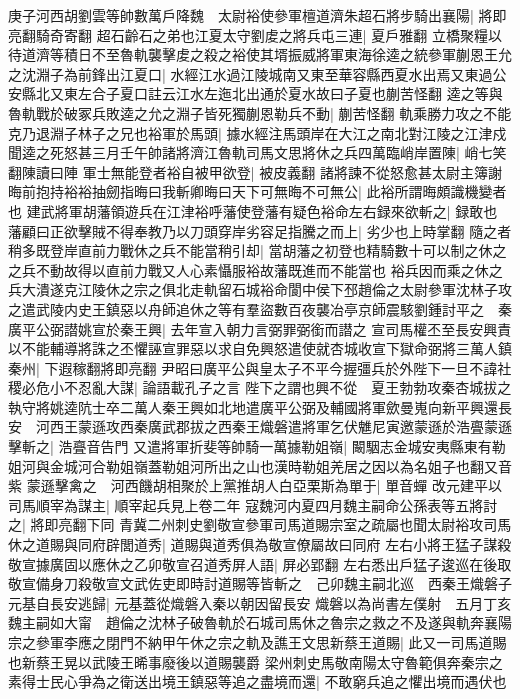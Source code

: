 庚子河西胡劉雲等帥數萬戶降魏　太尉裕使參軍檀道濟朱超石將步騎出襄陽|{
	將即亮翻騎奇寄翻}
超石齡石之弟也江夏太守劉䖍之將兵屯三連|{
	夏戶雅翻}
立橋聚糧以待道濟等積日不至魯軌襲擊䖍之殺之裕使其壻振威將軍東海徐逵之統參軍蒯恩王允之沈淵子為前鋒出江夏口|{
	水經江水過江陵城南又東至華容縣西夏水出焉又東過公安縣北又東左合子夏口註云江水左迤北出通於夏水故曰子夏也蒯苦怪翻}
逵之等與魯軌戰於破冢兵敗逵之允之淵子皆死獨蒯恩勒兵不動|{
	蒯苦怪翻}
軌乘勝力攻之不能克乃退淵子林子之兄也裕軍於馬頭|{
	據水經注馬頭岸在大江之南北對江陵之江津戍}
聞逵之死怒甚三月壬午帥諸將濟江魯軌司馬文思將休之兵四萬臨峭岸置陳|{
	峭七笑翻陳讀曰陣}
軍士無能登者裕自被甲欲登|{
	被皮義翻}
諸將諫不從怒愈甚太尉主簿謝晦前抱持裕裕抽劒指晦曰我斬卿晦曰天下可無晦不可無公|{
	此裕所謂晦頗識機變者也}
建武將軍胡藩領遊兵在江津裕呼藩使登藩有疑色裕命左右録來欲斬之|{
	録敢也}
藩顧曰正欲擊賊不得奉教乃以刀頭穿岸劣容足指騰之而上|{
	劣少也上時掌翻}
隨之者稍多既登岸直前力戰休之兵不能當稍引却|{
	當胡藩之初登也精騎數十可以制之休之之兵不動故得以直前力戰又人心素懾服裕故藩既進而不能當也}
裕兵因而乘之休之兵大潰遂克江陵休之宗之俱北走軌留石城裕命閬中侯下邳趙倫之太尉參軍沈林子攻之遣武陵内史王鎮惡以舟師追休之等有羣盜數百夜襲冶亭京師震駭劉鍾討平之　秦廣平公弼譛姚宣於秦王興|{
	去年宣入朝力言弼罪弼銜而譛之}
宣司馬權丕至長安興責以不能輔導將誅之丕懼誣宣罪惡以求自免興怒遣使就杏城收宣下獄命弼將三萬人鎮秦州|{
	下遐稼翻將即亮翻}
尹昭曰廣平公與皇太子不平今握彊兵於外陛下一旦不諱社稷必危小不忍亂大謀|{
	論語載孔子之言}
陛下之謂也興不從　夏王勃勃攻秦杏城拔之執守將姚逵阬士卒二萬人秦王興如北地遣廣平公弼及輔國將軍歛曼嵬向新平興還長安　河西王蒙遜攻西秦廣武郡拔之西秦王熾磐遣將軍乞伏魋尼寅邀蒙遜於浩亹蒙遜擊斬之|{
	浩亹音告門}
又遣將軍折斐等帥騎一萬據勒姐嶺|{
	闞駰志金城安夷縣東有勒姐河與金城河合勒姐嶺蓋勒姐河所出之山也漢時勒姐羌居之因以為名姐子也翻又音紫}
蒙遜擊禽之　河西饑胡相聚於上黨推胡人白亞栗斯為單于|{
	單音蟬}
改元建平以司馬順宰為謀主|{
	順宰起兵見上卷二年}
寇魏河内夏四月魏主嗣命公孫表等五將討之|{
	將即亮翻下同}
青冀二州刺史劉敬宣參軍司馬道賜宗室之疏屬也聞太尉裕攻司馬休之道賜與同府辟閭道秀|{
	道賜與道秀俱為敬宣僚屬故曰同府}
左右小將王猛子謀殺敬宣據廣固以應休之乙卯敬宣召道秀屏人語|{
	屏必郢翻}
左右悉出戶猛子逡巡在後取敬宣備身刀殺敬宣文武佐吏即時討道賜等皆斬之　己卯魏主嗣北巡　西秦王熾磐子元基自長安逃歸|{
	元基蓋從熾磐入秦以朝因留長安}
熾磐以為尚書左僕射　五月丁亥魏主嗣如大甯　趙倫之沈林子破魯軌於石城司馬休之魯宗之救之不及遂與軌奔襄陽宗之參軍李應之閉門不納甲午休之宗之軌及譙王文思新蔡王道賜|{
	此又一司馬道賜也新蔡王晃以武陵王晞事廢後以道賜襲爵}
梁州刺史馬敬南陽太守魯範俱奔秦宗之素得士民心爭為之衛送出境王鎮惡等追之盡境而還|{
	不敢窮兵追之懼出境而遇伏也}
